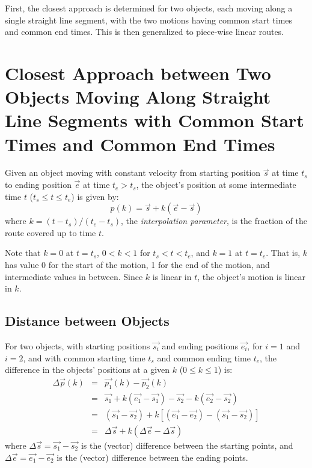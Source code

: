 \documentclass[times,12pt]{article}
\begin{document}
First, the closest approach is determined for two objects, each moving along a single straight line segment, with the two motions having common start times and common end times. This is then generalized to piece-wise linear routes.

\section{Closest Approach between Two Objects Moving Along Straight Line Segments with Common Start Times and Common End Times}
Given an object moving with constant velocity from starting position $\vec{s}$ at time $t_s$ to ending position $\vec{e}$ at time $t_e > t_s$, the object's position at some intermediate time $t$ ($t_s \le t \le t_e$) is given by:
\begin{equation}
\label{eqn:interpolate-position}
	p(k) = \vec{s} + k(\vec{e} - \vec{s})
\end{equation}
where $k = (t - t_s)/(t_e - t_s)$, the \textit{interpolation parameter}, is the fraction of the route covered up to time $t$.

Note that $k=0$ at $t=t_s$, $0 < k < 1$ for $t_s < t < t_e$, and $k=1$ at $t=t_e$. That is, $k$ has value 0 for the start of the motion, 1 for the end of the motion, and intermediate values in between. Since $k$ is linear in $t$, the object's motion is linear in $k$.

\subsection{Distance between Objects}

For two objects, with starting positions $\vec{s_i}$ and ending positions $\vec{e_i}$, for $i=1$ and $i=2$, and with common starting time $t_s$ and common ending time $t_e$, the difference in the objects' positions at a given $k$ ($0 \le k \le 1$) is:
\[
\begin{array}{lll}
	\Delta{\vec{p}}(k) & = & \vec{p_1}(k) - \vec{p_2}(k) \\
	& = & \vec{s_1} + k(\vec{e_1} - \vec{s_1}) - \vec{s_2} - k(\vec{e_2} - \vec{s_2}) \\
	& = & (\vec{s_1} - \vec{s_2}) + k[(\vec{e_1} - \vec{e_2}) - (\vec{s_1} - \vec{s_2})] \\
	& = & \Delta{\vec{s}} + k(\Delta{\vec{e}} - \Delta{\vec{s}})
\end{array}
\]
where $\Delta{\vec{s}} = \vec{s_1} - \vec{s_2}$ is the (vector) difference between the starting points, and $\Delta{\vec{e}} = \vec{e_1} - \vec{e_2}$ is the (vector) difference between the ending points.
\end{document}
